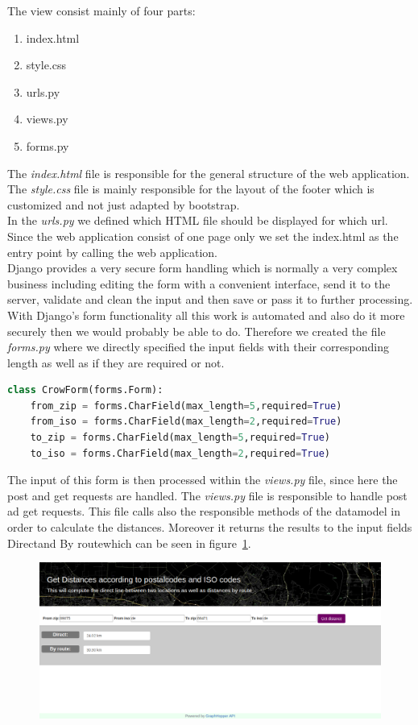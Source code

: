 The view consist mainly of four parts:
\begin{enumerate}
\item index.html
\item style.css
\item urls.py
\item views.py
\item forms.py
\end{enumerate}
The \emph{index.html} file is responsible for the general structure of the web application. The \emph{style.css} file is mainly responsible for the layout of the footer which is customized and not just adapted by bootstrap. \\
In the \emph{urls.py} we defined which HTML file should be displayed for which url. Since the web application consist of one page only we set the index.html as the entry point by calling the web application. \\
Django provides a very secure form handling which is normally a very complex business including editing the form with a convenient interface, send it to the server, validate and clean the input and then save or pass it to further processing. With Django's form functionality all this work is automated and also do it more securely then we would probably be able to do.
Therefore we created the file \emph{forms.py} where we directly specified the input fields with their corresponding length as well as if they are required or not.
\begin{lstlisting}[language=python,breaklines=true]
class CrowForm(forms.Form):
    from_zip = forms.CharField(max_length=5,required=True)
    from_iso = forms.CharField(max_length=2,required=True)
    to_zip = forms.CharField(max_length=5,required=True)
    to_iso = forms.CharField(max_length=2,required=True)
    \end{lstlisting}
The input of this form is then processed within the \emph{views.py} file, since here the post and get requests are handled.
The \emph{views.py} file is responsible to handle post ad get requests.
This file calls also the responsible methods of the datamodel in order to calculate the distances. 
Moreover it returns the results to the input fields \glqq Direct\grqq and \glqq By route\grqq which can be seen in figure~\ref{fig:webapp}.
\begin{figure}[H]
\hspace{-2.0cm}
\includegraphics[width=1.3\textwidth]{img/webapp}
\label{fig:webapp}
\end{figure}
